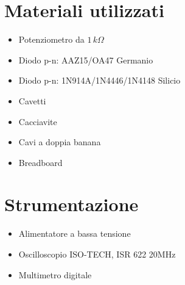 \documentclass[]{article}
\begin{document}
\section{Materiali utilizzati}
\begin{itemize}
	\item Potenziometro da $ 1 \,k\Omega $
	\item Diodo p-n: AAZ15/OA47 Germanio
	\item Diodo p-n: 1N914A/1N4446/1N4148 Silicio
	\item Cavetti
	\item Cacciavite
	\item Cavi a doppia banana
	\item Breadboard
\end{itemize}
\section{Strumentazione}
\begin{itemize}
	\item Alimentatore a bassa tensione
	\item Oscilloscopio ISO-TECH, ISR 622 20MHz
	\item Multimetro digitale
\end{itemize}
\end{document}

